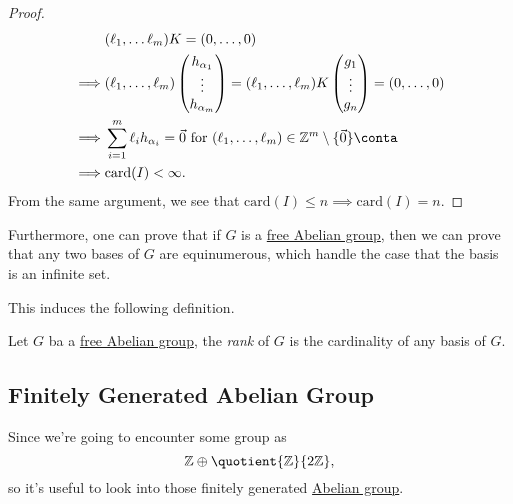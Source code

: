 \begin{proof}
\[\begin{split}
			&(\ell _1, \ldots \ell _{m}  )K = (0, \ldots , 0 )\\
			\implies &(\ell _1, \ldots , \ell _{m}  )\begin{pmatrix}
				h_{\alpha _1} \\
				\vdots        \\
				h_{\alpha _m} \\
			\end{pmatrix} = (\ell _1, \ldots , \ell _m )K \begin{pmatrix}
				g_1    \\
				\vdots \\
				g_n    \\
			\end{pmatrix} = (0, \ldots , 0)\\
			\implies &\sum\limits_{i=1}^{m} \ell _{i} h_{\alpha _{i} }= \vec{0} \text{ for \((\ell_1, \ldots, \ell_m)\in \mathbb{Z}^m\setminus \{\vec{0}\}\)} \conta\\
			\implies &\mathrm{card} (I) < \infty.
		\end{split}
	\]
	From the same argument, we see that \(\mathrm{card} (I) \leq n\implies \mathrm{card} (I) = n\).
\end{proof}

\begin{remark}
	Furthermore, one can prove that if \(G\) is a \hyperref[def:free-Abelian-group]{free Abelian group}, then we can prove that any two bases of \(G\) are equinumerous, which
	handle the case that the basis is an infinite set.
\end{remark}
This induces the following definition.

\begin{definition}[Rank]\label{def:rank}
	Let \(G\) ba a \hyperref[def:free-Abelian-group]{free Abelian group}, the \emph{rank} of \(G\) is the cardinality of any basis of \(G\).
\end{definition}

\subsection{Finitely Generated Abelian Group}\label{apx:ssc:finitely-generated-Abelian-group}
Since we're going to encounter some group as
\[
	\mathbb{\MakeUppercase{z}} \oplus \quotient{\mathbb{\MakeUppercase{z}}}{2\mathbb{\MakeUppercase{z}} },
\]
so it's useful to look into those finitely generated \hyperref[def:Abelian-group]{Abelian group}.

